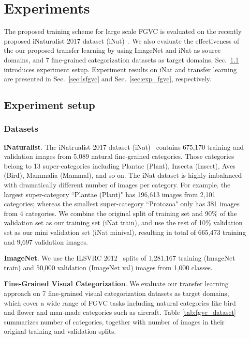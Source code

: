 \documentclass[10pt,twocolumn,letterpaper]{article}
\begin{document}
\section{Experiments}
\label{sec:experiments}

The proposed training scheme for large scale FGVC is evaluated on the recently proposed iNaturalist 2017 dataset (iNat)~\cite{inaturalist}.
We also evaluate the effectiveness of the our proposed transfer learning by using ImageNet and iNat as source domains, and 7 fine-grained categorization datasets as target domains.
Sec.\ \ref{sec:exp_setup} introduces experiment setup.
Experiment results on iNat and transfer learning are presented in Sec.\ \ref{sec:lsfgvc} and Sec.\ \ref{sec:exp_fgvc}, respectively.

\subsection{Experiment setup}
\label{sec:exp_setup}


\subsubsection{Datasets}
\label{sec:exp_datasets}

\textbf{iNaturalist}.
The iNatrualist 2017 dataset (iNat)~\cite{inaturalist} contains 675,170 training and validation images from 5,089 natural fine-grained categories.
Those categories belong to 13 super-categories including Plantae (Plant), Insecta (Insect), Aves (Bird), Mammalia (Mammal), and so on.
The iNat dataset is highly imbalanced with dramatically different number of images per category.
For example, the largest super-category ``Plantae (Plant)" has 196,613 images from 2,101 categories; whereas the smallest super-category ``Protozoa" only has 381 images from 4 categories.
We combine the original split of training set and 90\% of the validation set as our training set (iNat train), and use the rest of 10\% validation set as our mini validation set (iNat minival), resulting in total of 665,473 training and 9,697 validation images.



\textbf{ImageNet}.
We use the ILSVRC 2012~\cite{ilsvrc} splits of 1,281,167 training (ImageNet train) and 50,000 validation (ImageNet val) images from 1,000 classes.

\textbf{Fine-Grained Visual Categorization}.
We evaluate our transfer learning approach on 7 fine-grained visual categorization datasets as target domains, which cover a wide range of FGVC tasks including natural categories like bird and flower and man-made categories such as aircraft. 
Table \ref{tab:fgvc_dataset} summarizes number of categories, together with number of images in their original training and validation splits.
\end{document}
